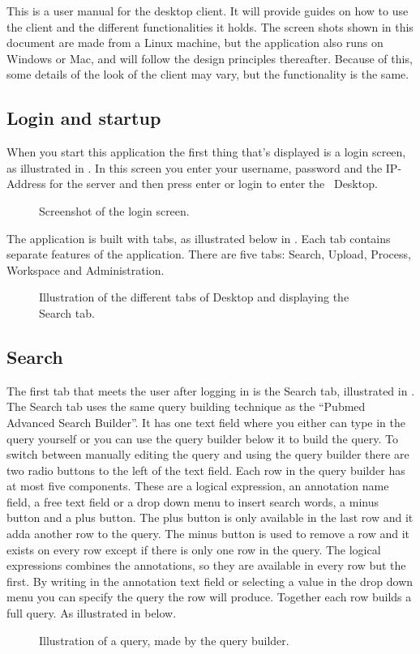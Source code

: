 This is a user manual for the desktop client. It will provide guides on how to 
use the client and the different functionalities it holds. The screen shots 
shown in this document are made from a Linux machine, but the application 
also runs on Windows or Mac, and will follow the design principles thereafter. 
Because of this, some details of the look of the client may vary, but the functionality is the same.

\subsection{Login and startup}
When you start this application the first thing that's displayed is a login screen, as illustrated in . In this screen you enter your username, password and the IP-Address for the server and then press enter or login to enter the \appName\ Desktop.

\begin{figure}[htb]
	\caption{Screenshot of the login screen.}
	\label{fig:des_login-pic}
\end{figure}
The application is built with tabs, as illustrated below in . Each tab contains separate features of the application. There are five tabs: Search, Upload, Process, Workspace and Administration.
\begin{figure}[htb]
	\caption{Illustration of the different tabs of \appName Desktop and displaying the Search tab.}
	\label{fig:des_tabs-view}
\end{figure}
\FloatBarrier

\subsection{Search}
The first tab that meets the user after logging in is the Search tab, illustrated in . The Search tab uses the same query building technique as the “Pubmed Advanced Search Builder”\cite{des_3}. It has one text field where you either can type in the query yourself or you can use the query builder below it to build the query. To switch between manually editing the query and using the query builder there are two radio buttons to the left of the text field. Each row in the query builder has at most five components. These are a logical expression, an annotation name field, a free text field or a drop down menu to insert search words, a minus button and a plus button. The plus button is only available in the last row and it adda another row to the query. The minus button is used to remove a row and it exists on every row except if there is only one row in the query. The logical expressions combines the annotations, so they are available in every row but the first.
By writing in the annotation text field or selecting a value in the drop down menu you can specify the query the row will produce. Together each row builds a full query. As illustrated in  below.
\begin{figure}[htb]
	\caption{Illustration of a query, made by the query builder.}
	\label{fig:des_search-query}
\end{figure}
\FloatBarrier
